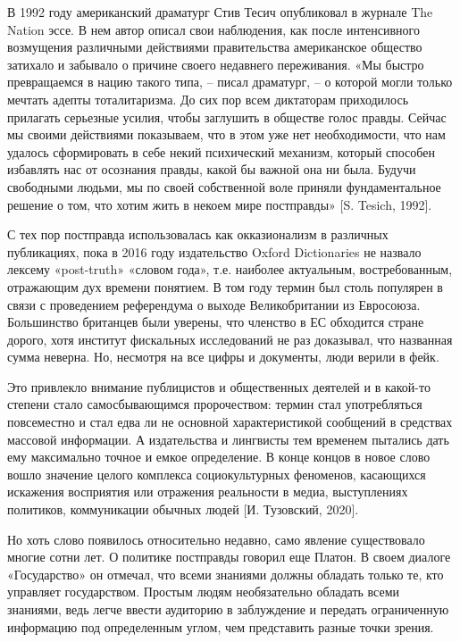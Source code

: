 В 1992 году американский драматург Стив Тесич опубликовал в журнале The Nation эссе. В нем автор описал свои наблюдения, как после интенсивного возмущения различными действиями правительства американское общество затихало и забывало о причине своего недавнего переживания. «Мы быстро превращаемся в нацию такого типа, – писал драматург, – о которой могли только мечтать адепты тоталитаризма. До сих пор всем диктаторам приходилось прилагать серьезные усилия, чтобы заглушить в обществе голос правды. Сейчас мы своими действиями показываем, что в этом уже нет необходимости, что нам удалось сформировать в себе некий психический механизм, который способен избавлять нас от осознания правды, какой бы важной она ни была. Будучи свободными людьми, мы по своей собственной воле приняли фундаментальное решение о том, что хотим жить в некоем мире постправды» [S. Tesich, 1992].

С тех пор постправда использовалась как окказионализм в различных публикациях, пока в 2016 году издательство Oxford Dictionaries не назвало лексему «post-truth» «словом года», т.е. наиболее актуальным, востребованным, отражающим дух времени понятием. В том году термин был столь популярен в связи с проведением референдума о выходе Великобритании из Евросоюза. Большинство британцев были уверены, что членство в ЕС обходится стране дорого, хотя институт фискальных исследований не раз доказывал, что названная сумма неверна. Но, несмотря на все цифры и документы, люди верили в фейк.

Это привлекло внимание публицистов и общественных деятелей и в какой-то степени стало самосбывающимся пророчеством: термин стал употребляться повсеместно и стал едва ли не основной характеристикой сообщений в средствах массовой информации. А издательства и лингвисты тем временем пытались дать ему максимально точное и емкое определение. В конце концов в новое слово вошло значение целого комплекса социокультурных феноменов, касающихся искажения восприятия или отражения реальности в медиа, выступлениях политиков, коммуникации обычных людей [И. Тузовский, 2020].

Но хоть слово появилось относительно недавно, само явление существовало многие сотни лет. О политике постправды говорил еще Платон. В своем диалоге «Государство» он отмечал, что всеми знаниями должны обладать только те, кто управляет государством. Простым людям необязательно обладать всеми знаниями, ведь легче ввести аудиторию в заблуждение и передать ограниченную информацию под определенным углом, чем представить разные точки зрения.

